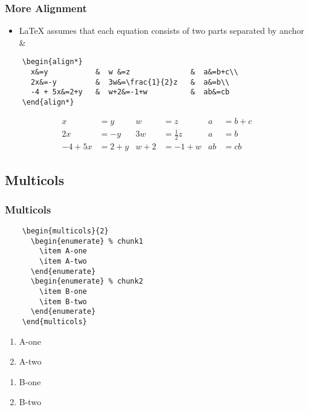 \documentclass{beamer}
\begin{document}
\begin{frame}[fragile]
  \frametitle{More Alignment}
  \begin{itemize}
    \item LaTeX assumes that each equation consists of two parts separated by
      anchor \&
  \end{itemize}
  \begin{verbatim}
    \begin{align*}
      x&=y           &  w &=z              &  a&=b+c\\
      2x&=-y         &  3w&=\frac{1}{2}z   &  a&=b\\
      -4 + 5x&=2+y   &  w+2&=-1+w          &  ab&=cb
    \end{align*}
  \end{verbatim}
  \begin{align*}
    x&=y           &  w &=z              &  a&=b+c\\
    2x&=-y         &  3w&=\frac{1}{2}z   &  a&=b\\
    -4 + 5x&=2+y   &  w+2&=-1+w          &  ab&=cb
  \end{align*}
\end{frame}

\subsection{Multicols}
\begin{frame}[fragile]
	\frametitle{Multicols}
  \begin{verbatim}
    \begin{multicols}{2}
      \begin{enumerate} % chunk1
        \item A-one
        \item A-two
      \end{enumerate}
      \begin{enumerate} % chunk2
        \item B-one
        \item B-two
      \end{enumerate}
    \end{multicols}
  \end{verbatim}

  \begin{multicols}{2}
  \begin{enumerate}
    \item A-one
    \item A-two
  \end{enumerate}
  \begin{enumerate}
    \item B-one
    \item B-two
  \end{enumerate}
  \end{multicols}
\end{frame}
\end{document}
